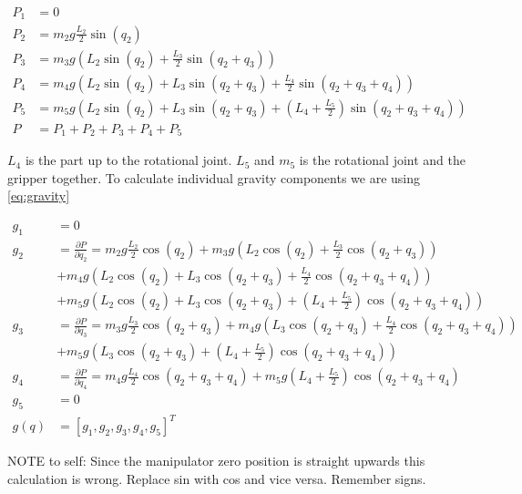      
     \begin{align*}
        P_1 &= 0
        \\
        P_2 &= m_2g\frac{L_2}{2}\sin{(q_2)}
        \\
        P_3 &= m_3g\left( L_2 \sin{(q_2)} + \frac{L_3}{2}\sin{(q_2 + q_3)} \right)
        \\
        P_4 &= m_4g\left( L_2 \sin{(q_2)} + L_3\sin{(q_2 + q_3)} + \frac{L_4}{2}\sin{(q_2+q_3+q_4)} \right)
        \\
        P_5 &= m_5g\left( L_2 \sin{(q_2)} + L_3\sin{(q_2 + q_3)} + \left(L_4 + \frac{L_5}{2} \right)\sin{(q_2+q_3+q_4)} \right)
        \\
        P &= P_1 + P_2 + P_3 + P_4 + P_5
     \end{align*}

     $L_4$ is the part up to the rotational joint. $L_5$ and $m_5$ is the rotational joint and the gripper together. To calculate individual gravity components we are using \eqref{eq:gravity}

     \begin{align*}
        g_1 &= 0
        \\
        g_2 &= \frac{\partial P}{\partial q_2} = 
        m_2g\frac{L_2}{2}\cos{(q_2)}+
        m_3g\left( L_2 \cos{(q_2)} + \frac{L_3}{2}\cos{(q_2+q_3)} \right)\\&+
        m_4g\left( L_2 \cos{(q_2)} + L_3\cos{(q_2 + q_3)} + \frac{L_4}{2}\cos{(q_2+q_3+q_4)} \right)\\&+
        m_5g\left( L_2 \cos{(q_2)} + L_3\cos{(q_2 + q_3)} + \left(L_4 + \frac{L_5}{2} \right)\cos{(q_2+q_3+q_4)} \right)
        \\
        g_3 &= \frac{\partial P}{\partial q_3} =
        m_3g\frac{L_3}{2}\cos{(q_2+q_3)} +
        m_4g\left( L_3\cos{(q_2 + q_3)} + \frac{L_4}{2}\cos{(q_2+q_3+q_4)} \right)\\&+
        m_5g\left(  L_3\cos{(q_2 + q_3)} + \left(L_4 + \frac{L_5}{2} \right)\cos{(q_2+q_3+q_4)} \right)
        \\
        g_4 &=\frac{\partial P}{\partial q_4} = 
        m_4g\frac{L_4}{2}\cos{(q_2+q_3+q_4)}+
        m_5g\left(L_4 + \frac{L_5}{2} \right)\cos{(q_2+q_3+q_4)}
        \\
        g_5 &= 0
        \\
        g(q) &= [g_1,g_2,g_3,g_4,g_5]^T
     \end{align*}

NOTE to self: Since the manipulator zero position is straight upwards this calculation is wrong. Replace sin with cos and vice versa. Remember signs. 

